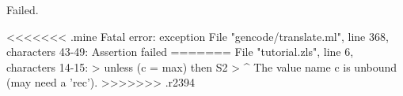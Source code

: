 \chklistingfalse
{}
\begin{ChkListingMsg}
Failed.
\end{ChkListingMsg}
\begin{ChkListingErr}
<<<<<<< .mine
Fatal error: exception File "gencode/translate.ml", line 368, characters 43-49: Assertion failed
=======
File "tutorial.zls", line 6, characters 14-15:
>      unless (c = max) then S2
>              ^
The value name c is unbound (may need a 'rec').
>>>>>>> .r2394
\end{ChkListingErr}
